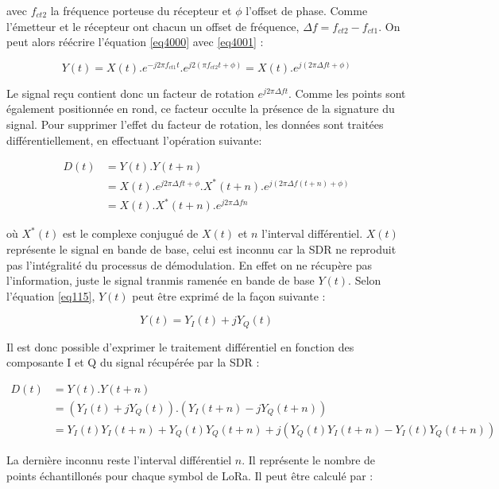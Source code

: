 avec $f_{ct2}$ la fréquence porteuse du récepteur et $\phi$ l'offset de phase. Comme l'émetteur et le récepteur ont chacun un offset de fréquence, $\Delta f = f_{ct2} - f_{ct1}$. On peut alors réécrire l'équation \ref{eq4000} avec \ref{eq4001} :

\begin{equation}\label{eq4002}
	Y(t) = X(t) . e^{-j2\pi f_{ct1} t} . e^{j2(\pi f_{ct2} t+ \phi)} = X(t) . e^{j(2\pi \Delta f t + \phi)}
\end{equation} 

Le signal reçu contient donc un facteur de rotation $e^{j2\pi \Delta f t}$. Comme les points sont également positionnée en rond, ce facteur occulte la présence de la signature du signal.
Pour supprimer l'effet du facteur de rotation, les données sont traitées différentiellement, en effectuant l'opération suivante:

\begin{align}\label{eq4003}
	D(t) &= Y(t) . Y(t+n) \\
		 &= X(t) . e^{j2\pi \Delta f t+ \phi} .X^{*}(t+n) . e^{j(2\pi \Delta f (t + n) + \phi)} \\
 		 &= X(t) . X^{*}(t+n) . e^{j2\pi \Delta f n}
\end{align}

où $X^{*}(t)$ est le complexe conjugué de $X(t)$ et $n$ l'interval différentiel. $X(t)$ représente le signal en bande de base, celui est inconnu car la SDR ne reproduit pas l'intégralité du processus de démodulation. En effet on ne récupère pas l'information, juste le signal tranmis ramenée en bande de base $Y(t)$. Selon l'équation \ref{eq115}, $Y(t)$ peut être exprimé de la façon suivante : 

\begin{equation}\label{eq4004}
	Y(t) = Y_I(t) + jY_Q(t)
\end{equation} 

Il est donc possible d'exprimer le traitement différentiel en fonction des composante I et Q du signal récupérée par la SDR :

\begin{align}\label{eq4005}
	D(t) &= Y(t) . Y(t+n) \\
		 &= (Y_I(t) + jY_Q(t)) . (Y_I(t+n) - jY_Q(t+n)) \\
 		 &= Y_I(t)Y_I(t+n) + Y_Q(t)Y_Q(t+n) + j(Y_Q(t)Y_I(t+n) - Y_I(t)Y_Q(t+n))
\end{align}

La dernière inconnu reste l'interval différentiel $n$. Il représente le nombre de points échantillonés pour chaque symbol de LoRa. Il peut être calculé par :

